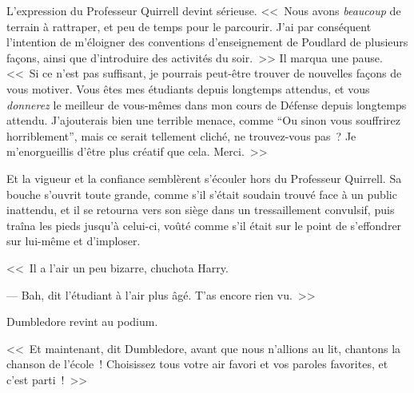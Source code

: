 L'expression du Professeur Quirrell devint sérieuse. <<~Nous avons \emph{beaucoup} de terrain à rattraper, et peu de temps pour le parcourir. J'ai par conséquent l'intention de m'éloigner des conventions d'enseignement de Poudlard de plusieurs façons, ainsi que d'introduire des activités du soir.~>> Il marqua une pause. <<~Si ce n'est pas suffisant, je pourrais peut-être trouver de nouvelles façons de vous motiver. Vous êtes mes étudiants depuis longtemps attendus, et vous \emph{donnerez} le meilleur de vous-mêmes dans mon cours de Défense depuis longtemps attendu. J'ajouterais bien une terrible menace, comme “Ou sinon vous souffrirez horriblement”, mais ce serait tellement cliché, ne trouvez-vous pas~? Je m'enorgueillis d'être plus créatif que cela. Merci.~>>

Et la vigueur et la confiance semblèrent s'écouler hors du Professeur Quirrell. Sa bouche s'ouvrit toute grande, comme s'il s'était soudain trouvé face à un public inattendu, et il se retourna vers son siège dans un tressaillement convulsif, puis traîna les pieds jusqu'à celui-ci, voûté comme s'il était sur le point de s'effondrer sur lui-même et d'imploser.

<<~Il a l'air un peu bizarre, chuchota Harry.

--- Bah, dit l'étudiant à l'air plus âgé. T'as encore rien vu.~>>

Dumbledore revint au podium.

<<~Et maintenant, dit Dumbledore, avant que nous n'allions au lit, chantons la chanson de l'école~! Choisissez tous votre air favori et vos paroles favorites, et c'est parti~!~>>

